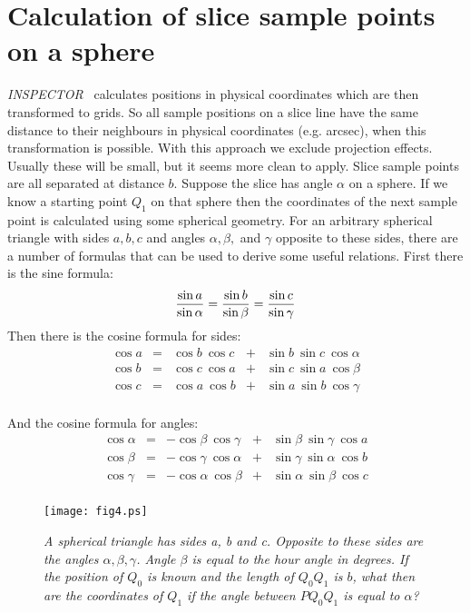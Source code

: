 \documentclass[11pt,a4paper]{article}
\begin{document}
\section{Calculation of slice sample points on a sphere}

{\it INSPECTOR\ } calculates positions in physical coordinates which are 
then transformed to grids. So all sample positions on a slice line have
the same distance to their neighbours in physical coordinates (e.g. arcsec),
when this transformation is possible. With this approach we exclude
projection effects. Usually these will be small, but it seems more clean to apply.
Slice sample points are all separated at distance $b$. Suppose the slice
has angle $\alpha$ on a sphere. If we know a starting point $Q_1$ on
that sphere then the coordinates of the next sample point is calculated
using some spherical geometry.
For an arbitrary spherical triangle with sides $a, b, c$ and angles $\alpha, \beta,$ and $\gamma$
opposite to these sides, there are a number of formulas that can be used to 
derive some useful relations.
First there is the sine formula:
$${\sin a \over{\sin \alpha}} = {\sin b \over{\sin \beta}} = {\sin c \over{\sin \gamma}}$$
Then there is the cosine formula for sides:
\begin{equation}
\begin{array} {rllll}
  \cos a &=& \cos b\ \cos c &+& \sin b\ \sin c\ \cos \alpha \\
  \cos b &=& \cos c\ \cos a &+& \sin c\ \sin a\ \cos \beta \\
  \cos c &=& \cos a\ \cos b &+& \sin a\ \sin b\ \cos \gamma \\
\end{array}
\end{equation}
 
And the cosine formula for angles:
\begin{equation}
\begin{array} {rllll}
  \cos \alpha &=& -\cos \beta\  \cos \gamma &+& \sin \beta\  \sin \gamma\ \cos a \\
  \cos \beta  &=& -\cos \gamma\ \cos \alpha &+& \sin \gamma\ \sin \alpha\ \cos b \\
  \cos \gamma &=& -\cos \alpha\ \cos \beta  &+& \sin \alpha\ \sin \beta\  \cos c \\
\end{array}
\end{equation}

 
\begin{figure}
   \centering
   \texttt{[image: fig4.ps]}
   \caption{\it A spherical triangle has sides a, b and c. Opposite to these
    sides are the angles $\alpha,  \beta, \gamma$. Angle $\beta$ is equal to the
    hour angle in degrees. 
    If the position of $Q_0$ is known and the length of $Q_0Q_1$ is $b$,
    what then are the coordinates of $Q_1$ if the angle between $PQ_0Q_1$
    is equal to $\alpha$?   }
   \label{fig:fig4}
\end{figure}
\end{document}
